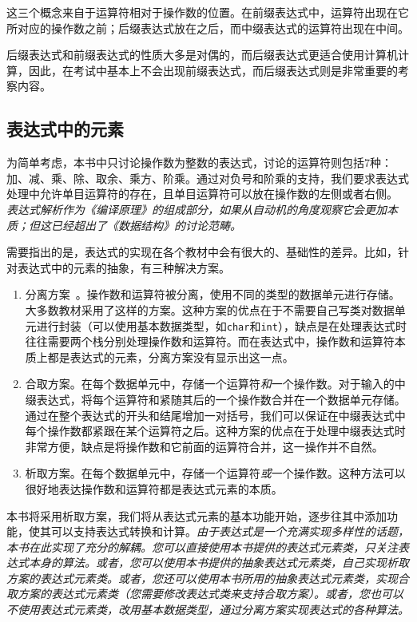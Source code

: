 这三个概念来自于运算符相对于操作数的位置。在前缀表达式中，运算符出现在它所对应的操作数之前；后缀表达式放在之后，而中缀表达式的运算符出现在中间。

后缀表达式和前缀表达式的性质大多是对偶的，而后缀表达式更适合使用计算机计算，因此，在考试中基本上不会出现前缀表达式，而后缀表达式则是非常重要的考察内容。

\subsection{表达式中的元素}

为简单考虑，本书中只讨论操作数为整数的表达式，讨论的运算符则包括7种：加、减、乘、除、取余、乘方、阶乘。通过对负号和阶乘的支持，我们要求表达式处理中允许单目运算符的存在，且单目运算符可以放在操作数的左侧或者右侧。
\textit{表达式解析作为《编译原理》的组成部分，如果从自动机的角度观察它会更加本质；但这已经超出了《数据结构》的讨论范畴。}

需要指出的是，表达式的实现在各个教材中会有很大的、基础性的差异。比如，针对表达式中的元素的抽象，有三种解决方案。

\begin{enumerate}
    \item 分离方案~\cite{邓俊辉2013数据结构}。操作数和运算符被分离，使用不同的类型的数据单元进行存储。大多数教材采用了这样的方案。这种方案的优点在于不需要自己写类对数据单元进行封装（可以使用基本数据类型，如\lstinline{char}和\lstinline{int}），缺点是在处理表达式时往往需要两个栈分别处理操作数和运算符。而在表达式中，操作数和运算符本质上都是表达式的元素，分离方案没有显示出这一点。
    \item 合取方案。在每个数据单元中，存储一个运算符\textit{和}一个操作数。对于输入的中缀表达式，将每个运算符和紧随其后的一个操作数合并在一个数据单元存储。通过在整个表达式的开头和结尾增加一对括号，我们可以保证在中缀表达式中每个操作数都紧跟在某个运算符之后。这种方案的优点在于处理中缀表达式时非常方便，缺点是将操作数和它前面的运算符合并，这一操作并不自然。
    \item 析取方案。在每个数据单元中，存储一个运算符\textit{或}一个操作数。这种方法可以很好地表达操作数和运算符都是表达式元素的本质。
\end{enumerate}

本书将采用析取方案，我们将从表达式元素的基本功能开始，逐步往其中添加功能，使其可以支持表达式转换和计算。\textit{由于表达式是一个充满实现多样性的话题，本书在此实现了充分的解耦。您可以直接使用本书提供的表达式元素类，只关注表达式本身的算法。或者，您可以使用本书提供的抽象表达式元素类，自己实现析取方案的表达式元素类。或者，您还可以使用本书所用的抽象表达式元素类，实现合取方案的表达式元素类（您需要修改表达式类来支持合取方案）。或者，您也可以不使用表达式元素类，改用基本数据类型，通过分离方案实现表达式的各种算法。}

